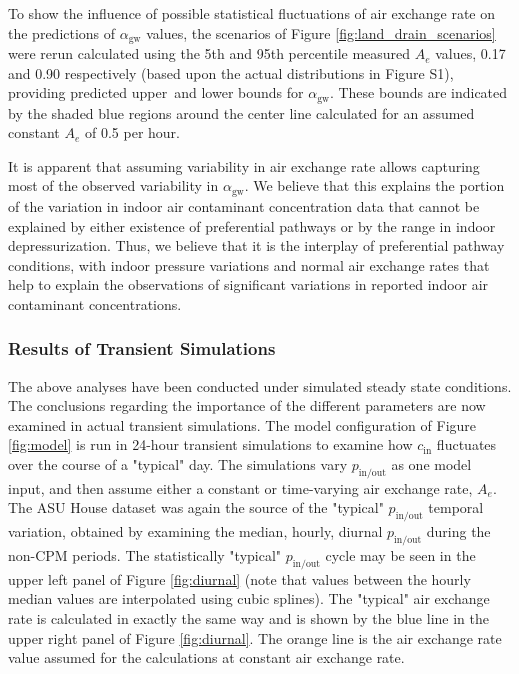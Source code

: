 To show the influence of possible statistical fluctuations of air exchange rate on the predictions of $\alpha_\mathrm{gw}$ values, the scenarios of Figure \ref{fig:land_drain_scenarios} were rerun calculated using the 5th and 95th percentile measured $A_e$ values, 0.17 and 0.90 respectively (based upon the actual distributions in Figure S1), providing predicted upper and lower bounds for $\alpha_\mathrm{gw}$.
These bounds are indicated by the shaded blue regions around the center line calculated for an assumed constant $A_e$ of 0.5 per hour.\par

It is apparent that assuming variability in air exchange rate allows capturing most of the observed variability in $\alpha_\mathrm{gw}$.
We believe that this explains the portion of the variation in indoor air contaminant concentration data that cannot be explained by either existence of preferential pathways or by the range in indoor depressurization.
Thus, we believe that it is the interplay of preferential pathway conditions, with indoor pressure variations and normal air exchange rates that help to explain the observations of significant variations in reported indoor air contaminant concentrations.\par

\subsubsection{Results of Transient Simulations}\label{s:results_modeling_transient}

The above analyses have been conducted under simulated steady state conditions.
The conclusions regarding the importance of the different parameters are now examined in actual transient simulations.
The model configuration of Figure \ref{fig:model} is run in 24-hour transient simulations to examine how $c_\mathrm{in}$ fluctuates over the course  of a "typical" day.
The simulations vary $p_\mathrm{in/out}$ as one model input, and then assume either a constant or time-varying air exchange rate, $A_e$.
The ASU House dataset was again the source of the "typical" $p_\mathrm{in/out}$ temporal variation, obtained by examining the median, hourly, diurnal $p_\mathrm{in/out}$ during the non-CPM periods.
The statistically "typical" $p_\mathrm{in/out}$ cycle may be seen in the upper left panel of Figure \ref{fig:diurnal} (note that values between the hourly median values are interpolated using cubic splines).
The "typical" air exchange rate is calculated in exactly the same way and is shown by the blue line in the upper right panel of Figure \ref{fig:diurnal}.
The orange line is the air exchange rate value assumed for the calculations at constant air exchange rate.\par

